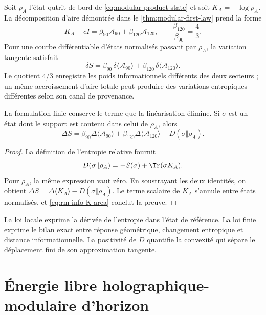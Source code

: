 Soit \(\rho_A\) l'état qutrit de bord de
\cref{eq:modular-product-state} et soit
\(K_A=-\log\rho_A\). La décomposition d'aire démontrée dans le
\cref{thm:modular-first-law} prend la forme
\begin{equation}
 K_A-cI
 =\beta_{90}\mathcal A_{90}
 +\beta_{120}\mathcal A_{120},
 \qquad
 \frac{\beta_{120}}{\beta_{90}}=\frac43.
 \label{eq:rm-info-K-area}
\end{equation}
Pour une courbe différentiable d'états normalisés passant par
\(\rho_A\), la variation tangente satisfait
\begin{equation}
 \boxed{
 \delta S
 =\beta_{90}\,\delta\langle\mathcal A_{90}\rangle
 +\beta_{120}\,\delta\langle\mathcal A_{120}\rangle.}
 \label{eq:rm-info-first-law}
\end{equation}
Le quotient \(4/3\) enregistre les poids informationnels différents des deux
secteurs ; un même accroissement d'aire totale peut produire des variations
entropiques différentes selon son canal de provenance.

La formulation finie conserve le terme que la linéarisation élimine.
Si \(\sigma\) est un état dont le support est contenu dans celui de
\(\rho_A\), alors
\begin{equation}
 \boxed{
 \Delta S
 =\beta_{90}\Delta\langle\mathcal A_{90}\rangle
 +\beta_{120}\Delta\langle\mathcal A_{120}\rangle
 -D(\sigma\Vert\rho_A).}
 \label{eq:rm-info-finite-law}
\end{equation}

\begin{proof}
La définition de l'entropie relative fournit
\[
 D(\sigma\Vert\rho_A)
 =-S(\sigma)+\Tr(\sigma K_A).
\]
Pour \(\rho_A\), la même expression vaut zéro. En soustrayant les deux
identités, on obtient
\(\Delta S=\Delta\langle K_A\rangle-D(\sigma\Vert\rho_A)\).
Le terme scalaire de \(K_A\) s'annule entre états normalisés, et
\cref{eq:rm-info-K-area} conclut la preuve.
\end{proof}

La loi locale exprime la dérivée de l'entropie dans l'état de
référence. La loi finie exprime le bilan exact entre réponse
géométrique, changement entropique et distance informationnelle. La positivité de
\(D\) quantifie la convexité qui sépare le déplacement fini de son
approximation tangente.

\section{Énergie libre holographique-modulaire d'horizon}

